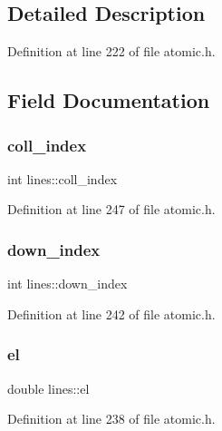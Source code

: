 \subsection{Detailed Description}


Definition at line 222 of file atomic.\+h.



\subsection{Field Documentation}
\mbox{\label{structlines_ae559930552d0a0d053b3e51262ac7984}} 
\subsubsection{\texorpdfstring{coll\+\_\+index}{coll\_index}}
{\footnotesize\ttfamily int lines\+::coll\+\_\+index}



Definition at line 247 of file atomic.\+h.

\mbox{\label{structlines_aedc43927b63718153801e7fbe95773d5}} 
\subsubsection{\texorpdfstring{down\+\_\+index}{down\_index}}
{\footnotesize\ttfamily int lines\+::down\+\_\+index}



Definition at line 242 of file atomic.\+h.

\mbox{\label{structlines_ae043cb5d7f06d4fc481c15c5a2273257}} 
\subsubsection{\texorpdfstring{el}{el}}
{\footnotesize\ttfamily double lines\+::el}



Definition at line 238 of file atomic.\+h.

\mbox{\label{structlines_acd7e99d636aefd7eb8868398ab09b8a9}} 

